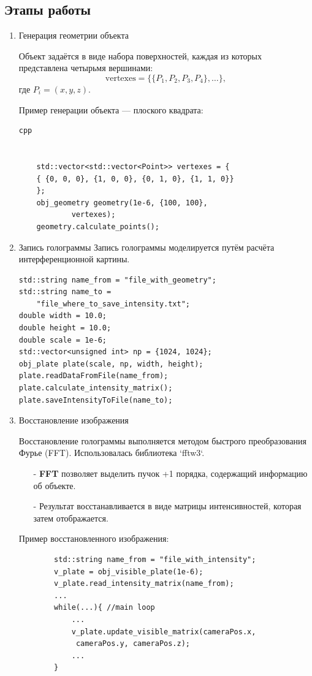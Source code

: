 \documentclass[aps,twocolumn,secnumarabic,balancelastpage,amsmath,amssymb,nofootinbib, floatfix]{revtex4-1}
\begin{document}
\subsection{Этапы работы} 
\begin{enumerate}
	\item Генерация геометрии объекта  
	
	Объект задаётся в виде набора поверхностей, каждая из которых представлена четырьмя вершинами:  
	\[
	\text{vertexes} = \{\{P_1, P_2, P_3, P_4\}, \dots\},
	\]  
	где \(P_i = (x, y, z)\).  
	
	Пример генерации объекта — плоского квадрата:  
	\begin{verbatim}cpp
		
		
	std::vector<std::vector<Point>> vertexes = {
	{ {0, 0, 0}, {1, 0, 0}, {0, 1, 0}, {1, 1, 0}}
	};
	obj_geometry geometry(1e-6, {100, 100}, 
			vertexes);
	geometry.calculate_points();
	\end{verbatim}
	\item Запись голограммы  
	Запись голограммы моделируется путём расчёта интерференционной картины. 
	\begin{verbatim}
std::string name_from = "file_with_geometry";
std::string name_to = 
	"file_where_to_save_intensity.txt";
double width = 10.0;
double height = 10.0;
double scale = 1e-6;
std::vector<unsigned int> np = {1024, 1024};
obj_plate plate(scale, np, width, height);
plate.readDataFromFile(name_from);
plate.calculate_intensity_matrix();
plate.saveIntensityToFile(name_to);
	\end{verbatim}
	\item Восстановление изображения  
	
	Восстановление голограммы выполняется методом быстрого преобразования Фурье (FFT). Использовалась библиотека `fftw3`. 
	\begin{enumerate}
		\item[-] \textbf{FFT} позволяет выделить пучок +1 порядка, содержащий информацию об объекте. 
		\item[-] Результат восстанавливается в виде матрицы интенсивностей, которая затем отображается.  
	\end{enumerate}
	Пример восстановленного изображения:
	\begin{verbatim}
		std::string name_from = "file_with_intensity";
		v_plate = obj_visible_plate(1e-6);
		v_plate.read_intensity_matrix(name_from);
		...
		while(...){ //main loop
			...
			v_plate.update_visible_matrix(cameraPos.x,
			 cameraPos.y, cameraPos.z);
			...
		}
	\end{verbatim}	
\end{enumerate}
\end{document}
